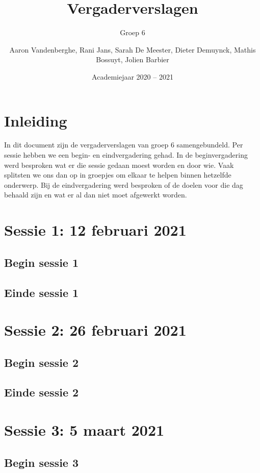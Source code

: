 \documentclass[a4paper,twoside,kulak]{kulakreport} %
\title{Vergaderverslagen}
\subtitle{Groep 6}
\author{Aaron Vandenberghe, Rani Jans, Sarah De Meester, Dieter Demuynck, Mathis Bossuyt, Jolien Barbier}
\institute{KU Leuven Kulak, Wetenschap \& Technologie}
\date{Academiejaar 2020 -- 2021}
\begin{document}
 

\titlepage

\tableofcontents


\chapter*{Inleiding}
In dit document zijn de vergaderverslagen van groep 6 samengebundeld. Per sessie hebben we een begin- en eindvergadering
gehad. In de beginvergadering werd besproken wat er die sessie gedaan moest worden en door wie. Vaak splitsten we ons dan op in groepjes om elkaar te helpen binnen hetzelfde onderwerp. Bij de eindvergadering werd besproken of de doelen voor die dag behaald zijn en wat er al dan niet moet afgewerkt worden. 

\chapter{Sessie 1: 12 februari 2021}
\section{Begin sessie 1}

\section{Einde sessie 1}


\chapter{Sessie 2: 26 februari 2021}
\section{Begin sessie 2}

\section{Einde sessie 2}


\chapter{Sessie 3: 5 maart 2021}
\section{Begin sessie 3}
\end{document}

